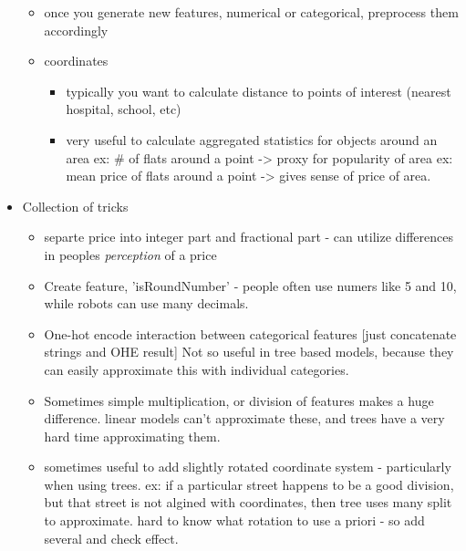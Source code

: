 \documentclass[a4paper]{report}
\begin{document}
\begin{itemize}
\begin{itemize}
      \item once you generate new features, numerical or categorical, preprocess them accordingly
      \item coordinates
	\begin{itemize}
	  \item typically you want to calculate distance to points of interest (nearest hospital, school, etc) 
	  \item very useful to calculate aggregated statistics for objects around an area
	    \subitem ex: \# of flats around a point -> proxy for popularity of area
	    \subitem ex: mean price of flats around a point -> gives sense of price of area.
	\end{itemize}
    \end{itemize}
  \item Collection of tricks
    \begin{itemize}
      \item separte price into integer part and fractional part - can utilize differences in peoples \emph{perception} of a price
      \item Create feature, 'isRoundNumber' - people often use numers like 5 and 10, while robots can use many decimals.
      \item One-hot encode interaction between categorical features [just concatenate strings and OHE result]
	\subitem Not so useful in tree based models, because they can easily approximate this with individual categories.
      \item Sometimes simple multiplication, or division of features makes a huge difference.	
	\subitem linear models can't approximate these, and trees have a very hard time approximating them.
      \item sometimes useful to add slightly rotated coordinate system - particularly when using trees. 
	\subitem ex: if a particular street happens to be a good division, but that street is not algined with coordinates, then tree uses many split to approximate.
	\subitem hard to know what rotation to use a priori - so add several and check effect.
    \end{itemize}
\end{itemize}
\end{document}
